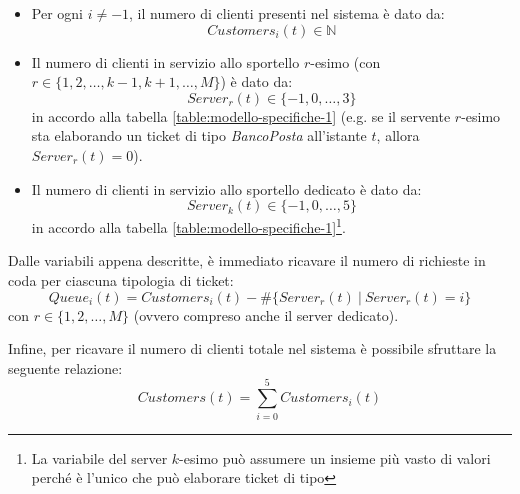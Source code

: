 \begin{itemize}
\item Per ogni $i \neq -1$, il numero di clienti presenti nel sistema è dato da:
\begin{equation}
Customers_i(t) \in \mathbb{N}
\end{equation}
\item Il numero di clienti in servizio allo sportello $r$-esimo (con $r \in \lbrace 1, 2, \dots, k-1, k+1, \dots, M \rbrace$) è dato da:
\begin{equation}
Server_r(t) \in \lbrace -1, 0, \dots, 3 \rbrace
\end{equation}
in accordo alla tabella \ref{table:modello-specifiche-1} (e.g. se il servente $r$-esimo sta elaborando un ticket di tipo \uo{} \textsl{BancoPosta} all'istante $t$, allora $Server_r(t)=0$).
\item Il numero di clienti in servizio allo sportello dedicato è dato da:
\begin{equation}
Server_k(t) \in \lbrace -1, 0, \dots, 5 \rbrace
\end{equation}
in accordo alla tabella \ref{table:modello-specifiche-1}\footnote{La variabile del server $k$-esimo può assumere un insieme più vasto di valori perché è l'unico che può elaborare ticket di tipo \sr{}}.
\end{itemize}

Dalle variabili appena descritte, è immediato ricavare il numero di richieste in coda per ciascuna tipologia di ticket:
\begin{equation}
Queue_i(t) = Customers_i(t) - \# \lbrace Server_r(t)\ \vert\ Server_r(t) = i \rbrace
\end{equation}
con $r \in \lbrace 1, 2, \dots, M \rbrace$ (ovvero compreso anche il server dedicato).

Infine, per ricavare il numero di clienti totale nel sistema è possibile sfruttare la seguente relazione:
\begin{equation}
Customers(t) = \sum_{i=0}^{5} Customers_i(t)
\end{equation}

